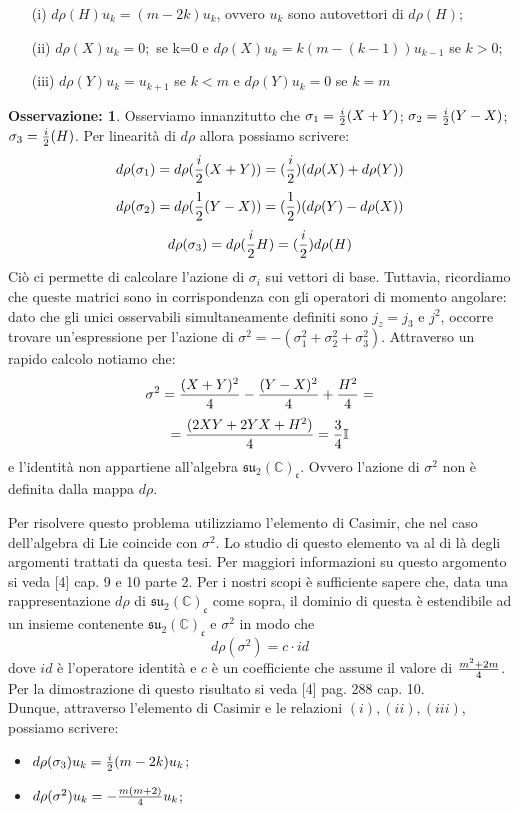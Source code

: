 \documentclass[12pt,a4paper]{report}
\theoremstyle{definition}
\theoremstyle{Theorem}
\theoremstyle{definition}
\theoremstyle{definition}
\theoremstyle{definition}
\newtheorem{Obs}[Def]{Osservazione:}
\begin{document}
\begin{itemize}
	\item[(i)] $d\rho(H)u_k=(m-2k)u_k$, ovvero $u_k$ sono autovettori di $d\rho(H)$;
	\item[(ii)] $d\rho(X)u_k=0;$ se k=0 e $d\rho(X)u_k=k(m-(k-1))u_{k-1}$ se $k>0$;
	\item[(iii)] $d\rho(Y)u_k=u_{k+1}$ se $k<m$ e $d\rho(Y)u_k=0$ se $k=m$
\end{itemize}
\begin{Obs}
	Osserviamo innanzitutto che $\sigma_1={i\over 2}(X+Y)$; $\sigma_2={i\over 2}(Y-X)$; $\sigma_3={i\over 2}(H)$. Per linearità di $d\rho$ allora possiamo scrivere: $$d\rho(\sigma_1)=d\rho({i\over 2}(X+Y))=({i\over2})(d\rho(X)+d\rho(Y))$$
	$$d\rho(\sigma_2)=d\rho({1\over 2}(Y-X))=({1\over2})(d\rho(Y)-d\rho(X))$$
	$$d\rho(\sigma_3)=d\rho({i\over 2}H)=({i\over2})d\rho(H)$$
	Ciò ci permette di calcolare l'azione di $\sigma_i$ sui vettori di base. Tuttavia, ricordiamo che queste matrici sono in corrispondenza con gli operatori di momento angolare: dato che gli unici osservabili simultaneamente definiti sono $j_z=j_3$ e $j^2$, occorre trovare un'espressione per l'azione di $\sigma^2=-(\sigma_1^2+\sigma_2^2+\sigma_3^2)$. Attraverso un rapido calcolo notiamo che:
	$$\sigma^2={(X+Y)^2\over 4}-{(Y-X)^2\over 4}+{H^2\over 4}=$$
	$$={(2XY+2YX+H^2)\over 4}={3\over 4}\mathbb{I}$$
	e l'identità non appartiene all'algebra $\mathfrak{su_2(\mathbb{C})_c}$. Ovvero l'azione di $\sigma^2$ non è definita dalla mappa $d\rho$. 
\end{Obs}
Per risolvere questo problema utilizziamo l'elemento di Casimir, che nel caso dell'algebra di Lie coincide con $\sigma^2$. Lo studio di questo elemento va al di là degli argomenti trattati da questa tesi. Per maggiori informazioni su questo argomento si veda [4] cap. 9 e 10 parte 2. Per i nostri scopi è sufficiente sapere che, data una rappresentazione $d\rho$ di $\mathfrak{su_2(\mathbb{C})_c}$ come sopra, il dominio di questa è estendibile ad un insieme contenente $\mathfrak{su_2(\mathbb{C})_c}$ e $\sigma^2$ in modo che
$$d\rho(\sigma^2)=c\cdot id$$ 
dove $id$ è l'operatore identità e $c$ è un coefficiente che assume il valore di $m^2+2m\over 4$. Per la dimostrazione di questo risultato si veda [4] pag. 288 cap. 10.\\
Dunque, attraverso l'elemento di Casimir e le relazioni $(i),(ii),(iii)$, possiamo scrivere:
	\begin{itemize}
		\centering
		\item $d\rho(\sigma_3)u_k={i\over 2}(m-2k)u_k$;
		\item $d\rho(\sigma^2)u_k=-{m(m+2)\over 4}u_k$;
	\end{itemize}
\end{document}
